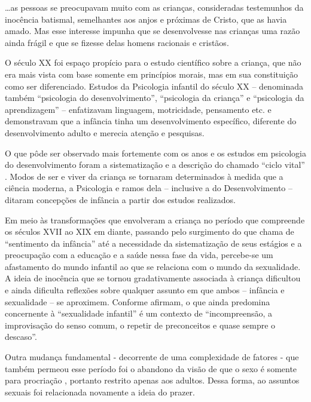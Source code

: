\begin{citacao}
	\ldots as pessoas se preocupavam muito com as crianças, consideradas testemunhos da inocência batismal, semelhantes aos anjos e próximas de Cristo, que as havia amado. Mas esse interesse impunha que se desenvolvesse nas crianças uma razão ainda frágil e que se fizesse delas homens racionais e cristãos.
\end{citacao}

O século XX foi espaço propício para o estudo científico sobre a criança, que não era mais vista com base somente em princípios morais, mas em sua constituição como ser diferenciado. Estudos da Psicologia infantil do século XX -- denominada também ``psicologia do desenvolvimento'', ``psicologia da criança'' e ``psicologia da aprendizagem'' -- enfatizavam linguagem, motricidade, pensamento etc. \cite[p. 643]{ALMEIDA2004} e demonstravam que a infância tinha um desenvolvimento específico, diferente do desenvolvimento adulto e merecia atenção e pesquisas.

O que pôde ser observado mais fortemente com os anos e os estudos em psicologia do desenvolvimento foram a sistematização e a descrição do chamado ``ciclo vital'' \cite[p. 20]{CASTRO1998}. Modos de ser e viver da criança se tornaram determinados à medida que a ciência moderna, a Psicologia e ramos dela -- inclusive a do Desenvolvimento -- ditaram concepções de infância a partir dos estudos realizados.

Em meio às transformações que envolveram a criança no período que compreende os séculos XVII ao XIX em diante, passando pelo surgimento do que  chama de ``sentimento da infância'' até a necessidade da sistematização de seus estágios e a preocupação com a educação e a saúde nessa fase da vida, percebe-se um afastamento do mundo infantil ao que se relaciona com o mundo da sexualidade. A ideia de inocência que se tornou gradativamente associada à criança dificultou e ainda dificulta reflexões sobre qualquer assunto em que ambos -- infância e sexualidade -- se aproximem. Conforme  afirmam, o que ainda predomina concernente à ``sexualidade infantil'' é um contexto de ``incompreensão, a improvisação do senso comum, o repetir de preconceitos e quase sempre o descaso''.

Outra mudança fundamental - decorrente de uma complexidade de fatores - que também permeou esse período foi o abandono da visão de que o sexo é somente para procriação \cite[não paginado]{REZENDE2008}, portanto restrito apenas aos adultos. Dessa forma, ao assuntos sexuais foi relacionada novamente a ideia do prazer. 

